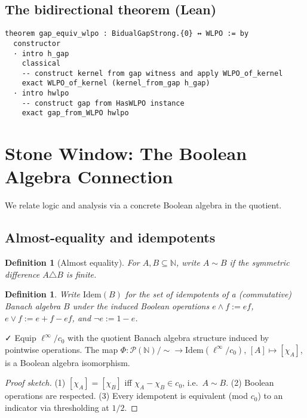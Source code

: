 \documentclass[11pt]{article}
\newtheorem{definition}[theorem]{Definition}
\newenvironment{defi}{\begin{definition}}{\end{definition}}
\newcommand{\leanok}{\textsf{\small \textcolor{green!70!black}{✓}}}
\newcommand{\N}{\mathbb{N}}
\newcommand{\linf}{\ell^\infty}
\newcommand{\cnull}{c_0}
\begin{document}
\subsection{The bidirectional theorem (Lean)}

\begin{lstlisting}[caption={WLPO ↔ Gap (top-level equivalence)}]
theorem gap_equiv_wlpo : BidualGapStrong.{0} ↔ WLPO := by
  constructor
  · intro h_gap
    classical
    -- construct kernel from gap witness and apply WLPO_of_kernel
    exact WLPO_of_kernel (kernel_from_gap h_gap)
  · intro hwlpo
    -- construct gap from HasWLPO instance
    exact gap_from_WLPO hwlpo
\end{lstlisting}

\section{Stone Window: The Boolean Algebra Connection}\label{sec:stone}

We relate logic and analysis via a concrete Boolean algebra in the quotient.

\subsection{Almost-equality and idempotents}

\begin{defi}[Almost equality]
For $A,B\subseteq\N$, write $A\sim B$ if the symmetric difference $A\triangle B$ is finite.
\end{defi}

\begin{defi}
Write $\mathrm{Idem}(B)$ for the set of idempotents of a (commutative) Banach algebra $B$ under the induced Boolean operations $e\wedge f:=ef$, $e\vee f:=e+f-ef$, and $\neg e:=1-e$.
\end{defi}

\begin{thm}\label{thm:stone}\leanok
Equip $\ell^\infty/c_0$ with the quotient Banach algebra structure induced by pointwise operations. The map
$\Phi:\mathcal{P}(\N)/{\sim}\to \mathrm{Idem}(\linf/\cnull)$,
$[A]\mapsto [\chi_A]$, is a Boolean algebra isomorphism.
\end{thm}

\begin{proof}[Proof sketch]
(1) $[\chi_A]=[\chi_B]$ iff $\chi_A-\chi_B\in \cnull$, i.e.\ $A\sim B$.  
(2) Boolean operations are respected.  
(3) Every idempotent is equivalent (mod $\cnull$) to an indicator via thresholding at $1/2$.
\end{proof}
\end{document}
